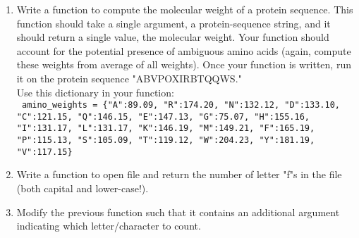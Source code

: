 \documentclass{article}[12pt]
\newcommand{\code}[1]{\texttt{#1}}  %
\begin{document}
\begin{enumerate}
	\item Write a function to compute the molecular weight of a protein sequence. This function should take a single argument, a protein-sequence string, and it should return a single value, the molecular weight. Your function should account for the potential presence of ambiguous amino acids (again, compute these weights from average of all weights). Once your function is written, run it on the protein sequence "ABVPOXIRBTQQWS." \\ Use this dictionary in your function:
	\\ \code{ amino\_weights = \{"A":89.09, "R":174.20, "N":132.12, "D":133.10, "C":121.15, "Q":146.15, "E":147.13, "G":75.07, "H":155.16, "I":131.17, "L":131.17, "K":146.19, "M":149.21, "F":165.19, "P":115.13, "S":105.09, "T":119.12, "W":204.23, "Y":181.19, "V":117.15\}} 
	
	\item Write a function to open file and return the number of letter "f"\textquotesingle s in the file (both capital and lower-case!). 

	\item Modify the previous function such that it contains an additional argument indicating which letter/character to count.
	
\end{enumerate}
\end{document}
